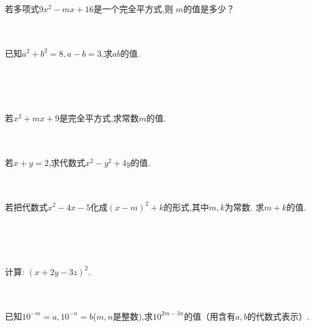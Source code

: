 \\ \\ \\
\item{
    若多项式$ 9x^2 - mx+16$是一个完全平方式,则 $m$的值是多少？
}
\\ \\ \\
\item{
    已知$a^2+b^2=8, a-b=3$,求$ab$的值.
    \iffalse
    \fangsong\zihao{4}
    思路: 看到$a^2+b^2, a-b, ab$, 应该想到完全平方公式.
    \fi
}
\\ \\ \\
\item{
    若$x^2+mx+9$是完全平方式,求常数$m$的值.
}
\\ \\ \\
\item{
    若$x+y=2$,求代数式$x^2-y^2+4y$的值.
}
\\ \\ \\
\item{
    若把代数式$x^2-4x-5$化成$(x-m)^2+k$的形式,其中$m,k$为常数. 求$m+k$的值.
    \iffalse
    \fangsong\zihao{4}
    思路: 把$(x-m)^2+k$转化为$ax^2+bx+c$的形式,再比较各项系数,解出$m,k$.\\
    注意: 系数的位置.

    解答: 
    \begin{align*}
        (x-m)^2+k &= x^2-2mx+m^2+k
    \end{align*}
    与$x^2-4x-5$比较,对应项的系数相等,常数项相等,得到方程
    \[\left\{ 
        \begin{array}{lc}
            2m = 4\\
            m^2+k=-5
        \end{array}
    \right.\]
    解得
    \[\left\{ 
        \begin{array}{lc}
            m = 2\\
            k =-9
        \end{array}
    \right.\]
    $\therefore m+k=-7.$
    \fi
}
\\ \\ \\
\item{
    计算: $(x+2y-3z)^2$.
}
\\ \\ \\
\item{
    已知$10^{-m}=a, 10^{-n}=b$($m, n$是整数),求$10^{2m-3n}$的值（用含有$a, b$的代数式表示）.
}
